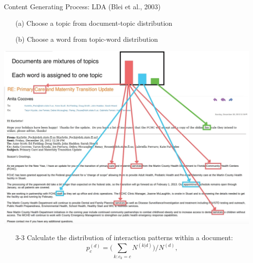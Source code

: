 \documentclass[10pt, xcolor=table]{beamer}
\theoremstyle{definition}
\theoremstyle{remark}
\begin{document}
\begin{frame}{Content Generating Process: LDA (Blei et al., 2003)}
\begin{minipage}{0.68\linewidth}
\begin{itemize}
		\begin{itemize}
			\item[(a)] Choose a topic from document-topic distribution\vspace{0.2cm} 
			\item[(b)] Choose a word from topic-word distribution
		\end{itemize} 
			\end{itemize}
		\end{minipage}
		\begin{minipage}{0.3\linewidth}
	\includegraphics[width=1.05\textwidth]{figures/LDAimage.jpeg}
		\end{minipage}
		\vspace{0.2cm}
				\begin{itemize}\item[3-3] Calculate the distribution of interaction patterns within a document:
		 \footnotesize\begin{equation*}
		p_c^{(d)} = \Big({\sum\limits_{k: c_k=c} N^{(k|d)}}\Big)/{N^{(d)}},
		\end{equation*}\normalsize
	\end{itemize}
\ei	
\end{frame}
\end{document}
